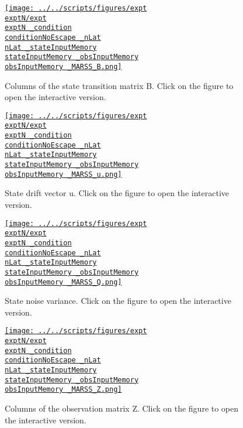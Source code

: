 \documentclass[12 pt]{article}  %
\begin{document}
\begin{figure}
    \begin{center}
            \href{http://www.gatsby.ucl.ac.uk/~rapela/sepi/reports/kfAnalysis/figures/expt\exptN/expt\exptN _condition\conditionNoEscape _nLat\nLat _stateInputMemory\stateInputMemory _obsInputMemory\obsInputMemory _MARSS_B.html}{\texttt{[image: ../../scripts/figures/expt\\exptN/expt\\exptN \_condition\\conditionNoEscape \_nLat\\nLat \_stateInputMemory\\stateInputMemory \_obsInputMemory\\obsInputMemory \_MARSS\_B.png]}}
            \caption{Columns of the state transition matrix B. Click on the figure to open the interactive version.}
        \label{fig:B}
    \end{center}
\end{figure}

\begin{figure}
    \begin{center}
            \href{http://www.gatsby.ucl.ac.uk/~rapela/sepi/reports/kfAnalysis/figures/expt\exptN/expt\exptN _condition\conditionNoEscape _nLat\nLat _stateInputMemory\stateInputMemory _obsInputMemory\obsInputMemory _MARSS_u.html}{\texttt{[image: ../../scripts/figures/expt\\exptN/expt\\exptN \_condition\\conditionNoEscape \_nLat\\nLat \_stateInputMemory\\stateInputMemory \_obsInputMemory\\obsInputMemory \_MARSS\_u.png]}}
            \caption{State drift vector u. Click on the figure to open the interactive version.}
        \label{fig:u}
    \end{center}
\end{figure}

\begin{figure}
    \begin{center}
            \href{http://www.gatsby.ucl.ac.uk/~rapela/sepi/reports/kfAnalysis/figures/expt\exptN/expt\exptN _condition\conditionNoEscape _nLat\nLat _stateInputMemory\stateInputMemory _obsInputMemory\obsInputMemory _MARSS_Q.html}{\texttt{[image: ../../scripts/figures/expt\\exptN/expt\\exptN \_condition\\conditionNoEscape \_nLat\\nLat \_stateInputMemory\\stateInputMemory \_obsInputMemory\\obsInputMemory \_MARSS\_Q.png]}}
            \caption{State noise variance. Click on the figure to open the interactive version.}
        \label{fig:Q}
    \end{center}
\end{figure}

\begin{figure}
    \begin{center}
            \href{http://www.gatsby.ucl.ac.uk/~rapela/sepi/reports/kfAnalysis/figures/expt\exptN/expt\exptN _condition\conditionNoEscape _nLat\nLat _stateInputMemory\stateInputMemory _obsInputMemory\obsInputMemory _MARSS_Z.html}{\texttt{[image: ../../scripts/figures/expt\\exptN/expt\\exptN \_condition\\conditionNoEscape \_nLat\\nLat \_stateInputMemory\\stateInputMemory \_obsInputMemory\\obsInputMemory \_MARSS\_Z.png]}}
            \caption{Columns of the observation matrix Z. Click on the figure to open the interactive version.}
        \label{fig:Z}
    \end{center}
\end{figure}
\end{document}
